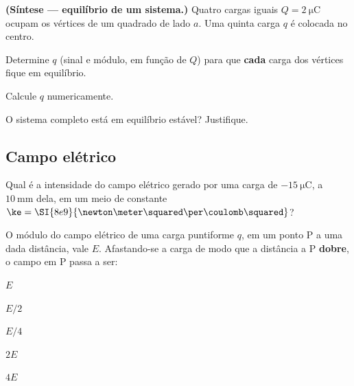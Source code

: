 \begin{questao}[4]{}

\textbf{(Síntese --- equilíbrio de um sistema.)} Quatro cargas iguais
$Q=\SI{2}{\micro\coulomb}$ ocupam os vértices de um quadrado de lado $a$. Uma
quinta carga $q$ é colocada no centro.
\begin{itensq}
\item Determine $q$ (sinal e módulo, em função de $Q$) para que \textbf{cada}
      carga dos vértices fique em equilíbrio.
\item Calcule $q$ numericamente.
\item O sistema completo está em equilíbrio estável? Justifique.
\end{itensq}


\end{questao}


\subsection{Campo elétrico}

\blocofixacao
\begin{questao}[1]{}

Qual é a intensidade do campo elétrico gerado por uma carga de
$\SI{-15}{\micro\coulomb}$, a $\SI{10}{\milli\meter}$ dela, em um meio de constante
$\ke = \SI{8e9}{\newton\meter\squared\per\coulomb\squared}$?


\end{questao}
\begin{questao}[1]{}

O módulo do campo elétrico de uma carga puntiforme $q$, em um ponto P a uma dada
distância, vale $E$. Afastando-se a carga de modo que a distância a P
\textbf{dobre}, o campo em P passa a ser:
\begin{alternativas}[3]
\item $E$
\item $E/2$
\item $E/4$
\item $2E$
\item $4E$
\end{alternativas}


\end{questao}


